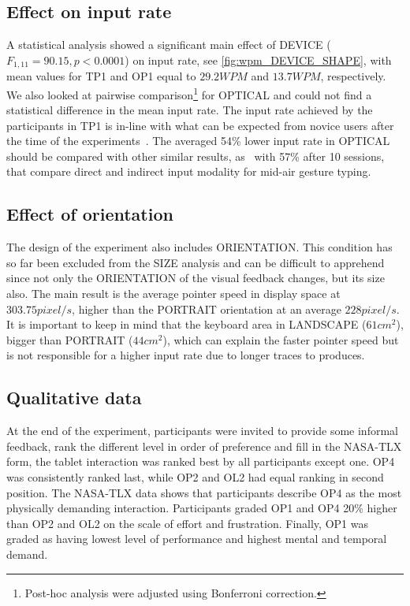 \documentclass{chi-ext}
\newcommand{\cdt}[1]{{\small\uppercase{{#1}}}}
\begin{document}
\subsection{Effect on input rate}
A statistical analysis showed a significant main effect of \cdt{DEVICE} ($F_{1,11} = 90.15, p < 0.0001$) on input rate, see \autoref{fig:wpm_DEVICE_SHAPE}, with mean values for \cdt{TP1} and \cdt{OP1} equal to $29.2 WPM$ and $13.7 WPM$, respectively. We also looked at pairwise comparison\footnote{Post-hoc analysis were adjusted using Bonferroni correction.} for \cdt{OPTICAL} and could not find a statistical difference in the mean input rate. The input rate achieved by the participants in \cdt{TP1} is in-line with what can be expected from novice users after the time of the experiments~\cite{Kristensson2004}. The averaged 54\% lower input rate in \cdt{OPTICAL} should be compared with other similar results, as~\cite{Markussen2014} with 57\% after 10 sessions, that compare direct and indirect input modality for mid-air gesture typing.

\subsection{Effect of orientation}
The design of the experiment also includes \cdt{ORIENTATION}. This condition has so far been excluded from the SIZE analysis and can be difficult to apprehend since not only the \cdt{ORIENTATION} of the visual feedback changes, but its size also. The main result is the average pointer speed in display space at $303.75 pixel/s$, higher than the PORTRAIT orientation at an average $228 pixel/s$. It is important to keep in mind that the keyboard area in LANDSCAPE ($61cm^2$), bigger than PORTRAIT ($44cm^2$), which can explain the faster pointer speed but is not responsible for a higher input rate due to longer traces to produces.

\subsection{Qualitative data}
At the end of the experiment, participants were invited to provide some informal feedback, rank the different level in order of preference and fill in the NASA-TLX form, the tablet interaction was ranked best by all participants except one. \cdt{OP4} was consistently ranked last, while \cdt{OP2} and \cdt{OL2} had equal ranking in second position. The NASA-TLX data shows that participants describe \cdt{OP4} as the most physically demanding interaction. Participants graded \cdt{OP1} and \cdt{OP4} 20\% higher than \cdt{OP2} and \cdt{OL2} on the scale of effort and frustration. Finally, \cdt{OP1} was graded as having lowest level of performance and highest mental and temporal demand.
\end{document}
